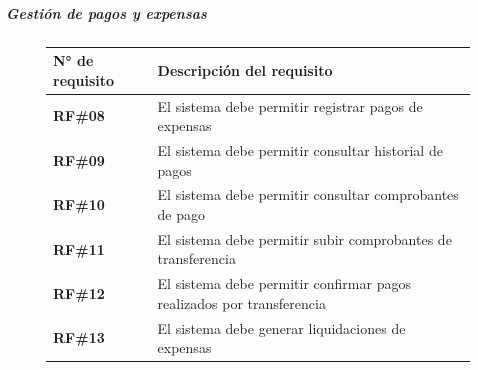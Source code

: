 \subparagraph{Gestión de pagos y expensas}

\begin{figure}[H]
    \centering
    \begin{tabular}{|l|p{11cm}|}
    \hline
            \textbf{N° de requisito} 
        
        & 

            \textbf{Descripción del requisito} 
        
    \\ \hline
    
            \textbf{RF\#08} 
        
        & 

            El sistema debe permitir registrar pagos de expensas 
        
    \\ \hline
    
            \textbf{RF\#09} 
        
        & 

            El sistema debe permitir consultar historial de pagos 
        
    \\ \hline
    
            \textbf{RF\#10} 
        
        & 

            El sistema debe permitir consultar comprobantes de pago 
        
    \\ \hline
    
            \textbf{RF\#11} 
        
        & 

            El sistema debe permitir subir comprobantes de transferencia 
        
    \\ \hline
    
            \textbf{RF\#12} 
        
        & 

            El sistema debe permitir confirmar pagos realizados por transferencia 
        
    \\ \hline
    
            \textbf{RF\#13} 
        
        & 

            El sistema debe generar liquidaciones de expensas 
        
    \\ \hline
    

\end{tabular}
\end{figure}
